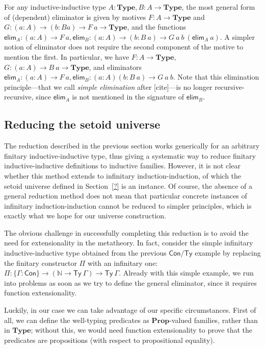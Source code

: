\documentclass{easychair}
\newcommand{\GG}{\Gamma}
\newcommand{\mType}{\mathbf{Type}}
\newcommand{\mProp}{\mathbf{Prop}}
\begin{document}
For any inductive-inductive type $A : \mType, B: A \to \mType$, the most general
form of (dependent) eliminator is given by motives $F : A \to \mType$ and $G :
(a : A) \to (b : B a) \to F\ a \to \mType$, and the functions $\textsf{elim}_A :
(a : A) \to F\ a, \textsf{elim}_B : (a : A) \to (b : B\ a) \to
G\ a\ b\ (\textsf{elim}_A\ a)$. A simpler notion of eliminator does not require
the second component of the motive to mention the first. In particular, we have
$F : A \to \mType$, $G : (a : A) \to B\ a \to \mType$, and eliminators
$\textsf{elim}_A : (a : A) \to F\ a, \textsf{elim}_B : (a : A) (b : B\ a) \to
G\ a\ b$. Note that this elimination principle---that we call \emph{simple
  elimination} after [cite]---is no longer recursive-recursive, since
$\textsf{elim}_A$ is not mentioned in the signature of $\textsf{elim}_B$.

\subsection{Reducing the setoid universe}

The reduction described in the previous section works generically for an
arbitrary finitary inductive-inductive type, thus giving a systematic way to
reduce finitary inductive-inductive definitions to inductive families. However,
it is not clear whether this method extends to infinitary induction-induction,
of which the setoid universe defined in Section~\ref{?} is an instance.
%
Of course, the absence of a general reduction method does not mean that
particular concrete instances of infinitary induction-induction cannot be
reduced to simpler principles, which is exactly what we hope for our universe
construction.

The obvious challenge in successfully completing this reduction is to avoid the
need for extensionality in the metatheory. In fact, consider the simple
infinitary inductive-inductive type obtained from the previous $\textsf{Con/Ty}$
example by replacing the finitary constructor $\Pi$ with an infinitary one: $\Pi
: \{\GG : \textsf{Con}\} \to (\mathds{N} \to \textsf{Ty}\ \GG) \to
\textsf{Ty}\ \GG$. Already with this simple example, we run into problems as
soon as we try to define the general eliminator, since it requires function
extensionality. 

Luckily, in our case we can take advantage of our specific circumstances. First
of all, we can define the well-typing predicates as $\mProp$-valued families,
rather than in $\mType$; without this, we would need function extensionality to
prove that the predicates are propositions (with respect to propositional
equality).
\end{document}
